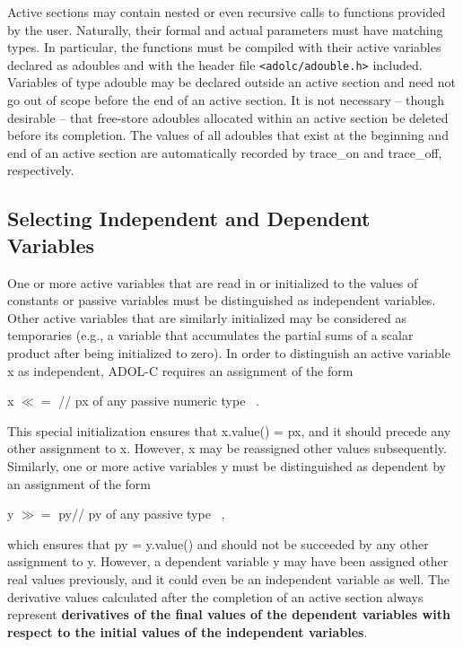 \documentclass[11pt,twoside]{article}
\begin{document}
Active sections may contain nested or even recursive calls to functions
provided by the user. Naturally, their formal and actual parameters
must have matching types. In particular, the functions must be 
compiled with their active variables declared as
{\sf adouble}s and with the header file \verb=<adolc/adouble.h>= included.  
Variables of type {\sf adouble} may be declared outside an active section and need not
go out of scope before the end of an active section. 
It is not necessary -- though desirable -- that free-store {\sf adouble}s
allocated within
an active section be deleted before its completion. The values of all
{\sf adouble}s that exist at the beginning and end of an active section
are automatically 
recorded by {\sf trace\_on} and {\sf trace\_off}, respectively.
%
\subsection{Selecting Independent and Dependent Variables}
%
One or more active variables that are read in or initialized to
the values of constants or passive variables must be distinguished as
independent variables. Other active variables that are similarly 
initialized may be considered as temporaries (e.g., a variable that
accumulates the partial sums of a scalar product after being 
initialized to zero). In order to distinguish an active variable {\sf x} as
independent, ADOL-C requires an assignment of the form
\begin{center}
{\sf x} \boldmath $\ll=$ \hspace{0.2in}// {\sf px} of any passive numeric type $\enspace .$
\end{center}
This special initialization ensures that {\sf x.value()} = {\sf px}, and it should
precede any other assignment to {\sf x}. However, {\sf x} may be reassigned
other values subsequently. Similarly, one or more active variables {\sf y}
must be distinguished as dependent by an assignment of the form
\begin{center}
{\sf y \boldmath $\gg=$ \unboldmath py}\hspace{0.2in}// {\sf py} of any  passive type $\enspace ,$ 
\end{center}
which ensures that {\sf py} = {\sf y.value()} and should not be succeeded 
by any other assignment to {\sf y}. However, a dependent variable {\sf y} 
may have been assigned other real values previously, and it could even be an 
independent variable as well.  The derivative values calculated after
the
completion of an active section always represent {\bf derivatives of the final 
values of the dependent variables with respect to the initial values of the
independent variables}. 
\end{document}
